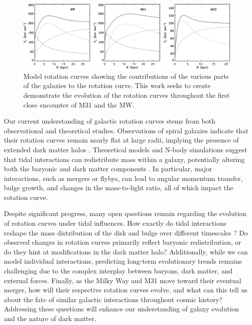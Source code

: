 \documentclass[twocolumn,linenumbers,trackchanges]{aastex7}
\begin{document}
\begin{figure}[ht!]
	\centering
	\includegraphics[width=1.0\linewidth]{Rotation_Curves_Besla.jpg}
	\caption{Model rotation curves showing the contributions of the various parts of the galaxies to the rotation curve. This work seeks to create demonstrate the evolution of the rotation curves throughout the first close encounter of M31 and the MW.}
\end{figure}

Our current understanding of galactic rotation curves stems from both observational and theoretical studies.
Observations of spiral galaxies indicate that their rotation curves remain nearly flat at large radii, implying the presence of extended dark matter halos \citep{GalacticBulges}.
Theoretical models and N-body simulations suggest that tidal interactions can redistribute mass within a galaxy, potentially altering both the baryonic and dark matter components \citep{Besla2012}.
In particular, major interactions, such as mergers or flybys, can lead to angular momentum transfer, bulge growth, and changes in the mass-to-light ratio, all of which impact the rotation curve.

Despite significant progress, many open questions remain regarding the evolution of rotation curves under tidal influences.
How exactly do tidal interactions reshape the mass distribution of the disk and bulge over different timescales \citep{Kannan2015}?
Do observed changes in rotation curves primarily reflect baryonic redistribution, or do they hint at modifications in the dark matter halo?
Additionally, while we can model individual interactions, predicting long-term evolutionary trends remains challenging due to the complex interplay between baryons, dark matter, and external forces.
Finally, as the Milky Way and M31 move toward their eventual merger, how will their respective rotation curves evolve, and what can this tell us about the fate of similar galactic interactions throughout cosmic history?
Addressing these questions will enhance our understanding of galaxy evolution and the nature of dark matter.
\end{document}
